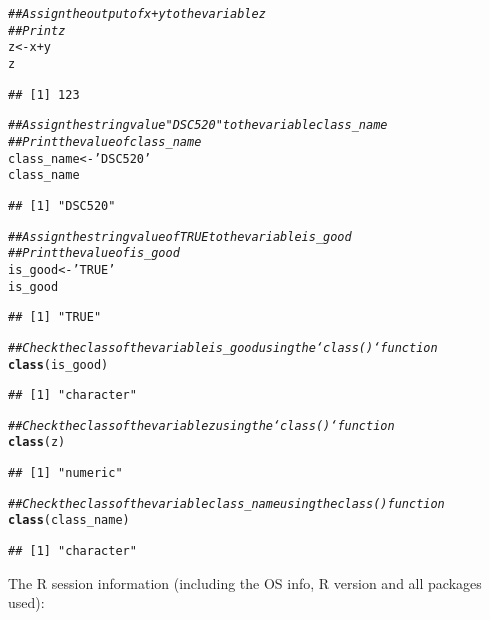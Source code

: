 \documentclass{article}\usepackage[]{graphicx}\usepackage[]{xcolor}
\makeatletter
\newcommand{\hlstr}[1]{\textcolor[rgb]{0.192,0.494,0.8}{#1}}%
\newcommand{\hlcom}[1]{\textcolor[rgb]{0.678,0.584,0.686}{\textit{#1}}}%
\newcommand{\hlopt}[1]{\textcolor[rgb]{0,0,0}{#1}}%
\newcommand{\hlstd}[1]{\textcolor[rgb]{0.345,0.345,0.345}{#1}}%
\newcommand{\hlkwb}[1]{\textcolor[rgb]{0.69,0.353,0.396}{#1}}%
\newcommand{\hlkwd}[1]{\textcolor[rgb]{0.737,0.353,0.396}{\textbf{#1}}}%
\newenvironment{kframe}{%
 \def\at@end@of@kframe{}%
 \ifinner\ifhmode%
  \def\at@end@of@kframe{\end{minipage}}%
  \begin{minipage}{\columnwidth}%
 \fi\fi%
 \def\FrameCommand##1{\hskip\@totalleftmargin \hskip-\fboxsep
 \colorbox{shadecolor}{##1}\hskip-\fboxsep
     \hskip-\linewidth \hskip-\@totalleftmargin \hskip\columnwidth}%
 \MakeFramed {\advance\hsize-\width
   \@totalleftmargin\z@ \linewidth\hsize
   \@setminipage}}%
 {\par\unskip\endMakeFramed%
 \at@end@of@kframe}
\newenvironment{knitrout}{}{} %
\makeatother
\begin{document}
\begin{knitrout}
\begin{kframe}
\begin{alltt}
\hlcom{## Assign the output of x + y to the variable z}
\hlcom{## Print z}
\hlstd{z} \hlkwb{<-} \hlstd{x} \hlopt{+} \hlstd{y}
\hlstd{z}
\end{alltt}
\begin{verbatim}
## [1] 123
\end{verbatim}
\begin{alltt}
\hlcom{## Assign the string value "DSC520" to the variable class_name}
\hlcom{## Print the value of class_name}
\hlstd{class_name} \hlkwb{<-} \hlstr{'DSC520'}
\hlstd{class_name}
\end{alltt}
\begin{verbatim}
## [1] "DSC520"
\end{verbatim}
\begin{alltt}
\hlcom{## Assign the string value of TRUE to the variable is_good}
\hlcom{## Print the value of is_good}
\hlstd{is_good} \hlkwb{<-} \hlstr{'TRUE'}
\hlstd{is_good}
\end{alltt}
\begin{verbatim}
## [1] "TRUE"
\end{verbatim}
\begin{alltt}
\hlcom{## Check the class of the variable is_good using the `class()` function}
\hlkwd{class}\hlstd{(is_good)}
\end{alltt}
\begin{verbatim}
## [1] "character"
\end{verbatim}
\begin{alltt}
\hlcom{## Check the class of the variable z using the `class()` function}
\hlkwd{class}\hlstd{(z)}
\end{alltt}
\begin{verbatim}
## [1] "numeric"
\end{verbatim}
\begin{alltt}
\hlcom{## Check the class of the variable class_name using the class() function}
\hlkwd{class}\hlstd{(class_name)}
\end{alltt}
\begin{verbatim}
## [1] "character"
\end{verbatim}
\end{kframe}
\end{knitrout}

The R session information (including the OS info, R version and all
packages used):
\end{document}
